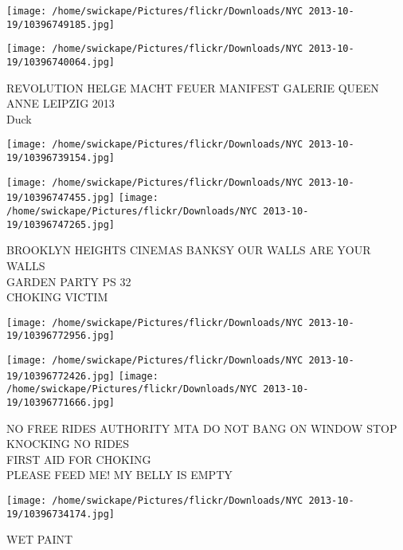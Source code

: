 \documentclass[10pt,letterpaper]{article}
\begin{document}
\texttt{[image: /home/swickape/Pictures/flickr/Downloads/NYC 2013-10-19/10396749185.jpg]}

\vspace{0.25in}
\texttt{[image: /home/swickape/Pictures/flickr/Downloads/NYC 2013-10-19/10396740064.jpg]}

REVOLUTION HELGE MACHT FEUER MANIFEST GALERIE QUEEN ANNE LEIPZIG 2013\\
Duck\\
\pagebreak

\texttt{[image: /home/swickape/Pictures/flickr/Downloads/NYC 2013-10-19/10396739154.jpg]}

\vspace{0.25in}
\texttt{[image: /home/swickape/Pictures/flickr/Downloads/NYC 2013-10-19/10396747455.jpg]}
\texttt{[image: /home/swickape/Pictures/flickr/Downloads/NYC 2013-10-19/10396747265.jpg]}

BROOKLYN HEIGHTS CINEMAS BANKSY OUR WALLS ARE YOUR WALLS\\
GARDEN PARTY PS 32\\
CHOKING VICTIM\\
\pagebreak

\texttt{[image: /home/swickape/Pictures/flickr/Downloads/NYC 2013-10-19/10396772956.jpg]}

\vspace{0.25in}
\texttt{[image: /home/swickape/Pictures/flickr/Downloads/NYC 2013-10-19/10396772426.jpg]}
\texttt{[image: /home/swickape/Pictures/flickr/Downloads/NYC 2013-10-19/10396771666.jpg]}

NO FREE RIDES AUTHORITY MTA DO NOT BANG ON WINDOW STOP KNOCKING NO RIDES\\
FIRST AID FOR CHOKING\\
PLEASE FEED ME! MY BELLY IS EMPTY\\
\pagebreak

\texttt{[image: /home/swickape/Pictures/flickr/Downloads/NYC 2013-10-19/10396734174.jpg]}

WET PAINT\\
\pagebreak
\end{document}
